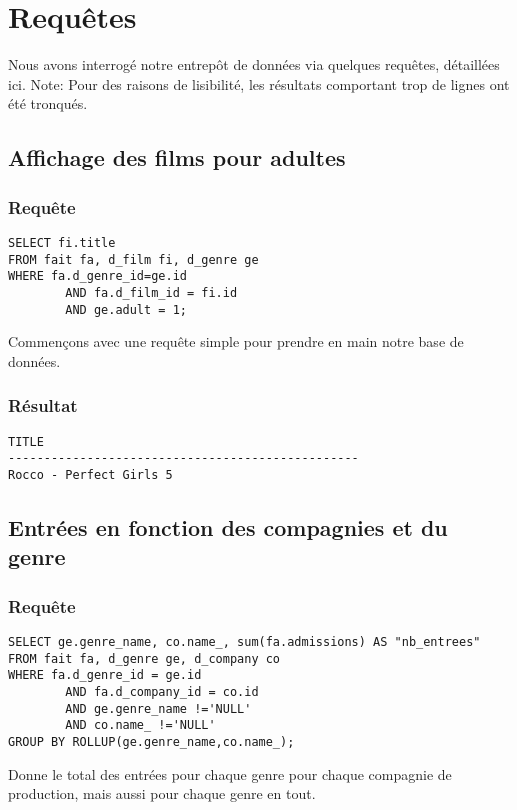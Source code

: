 \section{Requêtes}

Nous avons interrogé notre entrepôt de données via quelques requêtes, détaillées ici.
Note: Pour des raisons de lisibilité, les résultats comportant trop de lignes ont été tronqués.

\subsection{Affichage des films pour adultes}
\subsubsection{Requête}
\begin{lstlisting}
SELECT fi.title
FROM fait fa, d_film fi, d_genre ge
WHERE fa.d_genre_id=ge.id
		AND fa.d_film_id = fi.id
		AND ge.adult = 1;
\end{lstlisting}
Commençons avec une requête simple pour prendre en main notre base de données.
\subsubsection{Résultat}
\begin{lstlisting}
TITLE
-------------------------------------------------
Rocco - Perfect Girls 5
\end{lstlisting}

\subsection{Entrées en fonction des compagnies et du genre}
\subsubsection{Requête}
\begin{lstlisting}
SELECT ge.genre_name, co.name_, sum(fa.admissions) AS "nb_entrees"
FROM fait fa, d_genre ge, d_company co
WHERE fa.d_genre_id = ge.id
		AND fa.d_company_id = co.id
		AND ge.genre_name !='NULL'
		AND co.name_ !='NULL'
GROUP BY ROLLUP(ge.genre_name,co.name_);
\end{lstlisting}
Donne le total des entrées pour chaque genre pour chaque compagnie de production, mais aussi pour chaque genre en tout.
